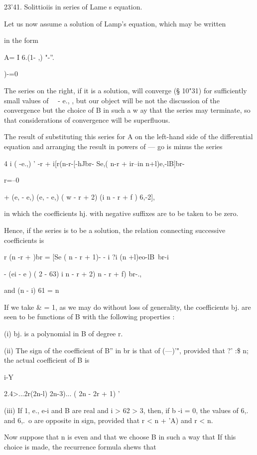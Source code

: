 {{{{23'41. Solittioiis in series of Lame s equation.

Let us now assume a solution of Lamp's equation, which may be written

in the form

A= I 6.(1- ,) "-''.

)-=0

The series on the right, if it is a solution, will converge (§ 10"31)
for sufficiently small values of \ \ - e., , but our object will be
not the discussion of the convergence but the choice of B in such a w
ay that the series may terminate, so that considerations of
convergence will be superfluous.

The result of substituting this series for A on the left-hand side of
the differential equation and arranging the result in powers of — go
is minus the series

4 i ( -e.,) ' -r + i[r(n-r-[-hJbr- Se,( n-r + ir--in n+l)e,-lB]br-

r=--0

+ (e, - e,) (e, - e,) ( w - r + 2) (i n - r + f ) 6,-2],

in which the coefficients hj. with negative suffixes are to be taken
to be zero.

Hence, if the series is to be a solution, the relation connecting
successive coefficients is

r (n -r + )br = [Se ( n - r + 1)- - i ?i (n +l)eo-lB\ br-i

- (ei - e ) ( 2 - 63) i n - r + 2) n - r + f) br-.,

and (n - i) 61 = n%

If we take \& = 1, as we may do without loss of generality, the
coefficients bj. are seen to be functions of B with the following
properties :

(i) bj. is a polynomial in B of degree r.

(ii) The sign of the coefficient of B'' in br is that of (—)'",
provided that ?' :\$ n; the actual coefficient of B is

i-Y

2.4>...2r(2n-l) 2n-3)... ( 2n - 2r + 1) '

(iii) If 1, e., e-i and B are real and i > 62 > 3, then, if b -i = 0,
the values of 6,. and 6,.\ o are opposite in sign, provided that r < n
+ 'A) and r < n.

Now suppose that n is even and that we choose B in such a way that If
this choice is made, the recurrence formula shews that

}}}}

